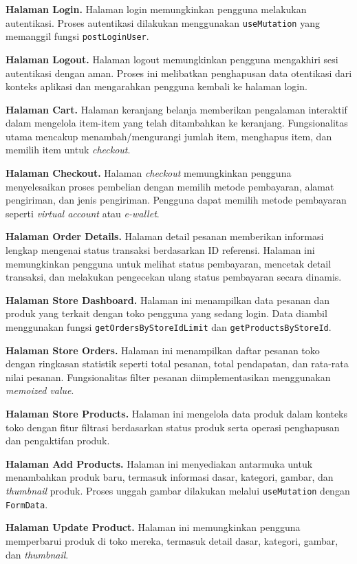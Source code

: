 \documentclass[12pt,a4paper,twocolumn]{article}
\begin{document}
\textbf{Halaman Login.} Halaman login memungkinkan pengguna melakukan autentikasi. Proses autentikasi dilakukan menggunakan \texttt{useMutation} yang memanggil fungsi \texttt{postLoginUser}.

\textbf{Halaman Logout.} Halaman logout memungkinkan pengguna mengakhiri sesi autentikasi dengan aman. Proses ini melibatkan penghapusan data otentikasi dari konteks aplikasi dan mengarahkan pengguna kembali ke halaman login.

\textbf{Halaman Cart.} Halaman keranjang belanja memberikan pengalaman interaktif dalam mengelola item-item yang telah ditambahkan ke keranjang. Fungsionalitas utama mencakup menambah/mengurangi jumlah item, menghapus item, dan memilih item untuk \textit{checkout}.

\textbf{Halaman Checkout.} Halaman \textit{checkout} memungkinkan pengguna menyelesaikan proses pembelian dengan memilih metode pembayaran, alamat pengiriman, dan jenis pengiriman. Pengguna dapat memilih metode pembayaran seperti \textit{virtual account} atau \textit{e-wallet}.

\textbf{Halaman Order Details.} Halaman detail pesanan memberikan informasi lengkap mengenai status transaksi berdasarkan ID referensi. Halaman ini memungkinkan pengguna untuk melihat status pembayaran, mencetak detail transaksi, dan melakukan pengecekan ulang status pembayaran secara dinamis.

\textbf{Halaman Store Dashboard.} Halaman ini menampilkan data pesanan dan produk yang terkait dengan toko pengguna yang sedang login. Data diambil menggunakan fungsi \texttt{getOrdersByStoreIdLimit} dan \texttt{getProductsByStoreId}.

\textbf{Halaman Store Orders.} Halaman ini menampilkan daftar pesanan toko dengan ringkasan statistik seperti total pesanan, total pendapatan, dan rata-rata nilai pesanan. Fungsionalitas filter pesanan diimplementasikan menggunakan \textit{memoized value}.

\textbf{Halaman Store Products.} Halaman ini mengelola data produk dalam konteks toko dengan fitur filtrasi berdasarkan status produk serta operasi penghapusan dan pengaktifan produk.

\textbf{Halaman Add Products.} Halaman ini menyediakan antarmuka untuk menambahkan produk baru, termasuk informasi dasar, kategori, gambar, dan \textit{thumbnail} produk. Proses unggah gambar dilakukan melalui \texttt{useMutation} dengan \texttt{FormData}.

\textbf{Halaman Update Product.} Halaman ini memungkinkan pengguna memperbarui produk di toko mereka, termasuk detail dasar, kategori, gambar, dan \textit{thumbnail}.
\end{document}

